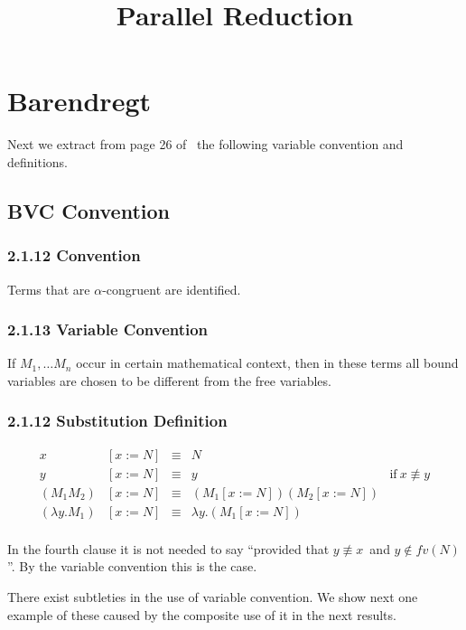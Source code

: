 \documentclass{article}
\title{Parallel Reduction}
\newcommand{\alp}{\ensuremath{\alpha}}
\newcommand{\lam}{\ensuremath{\lambda}}
\begin{document}
\maketitle

\section{Barendregt}

Next we extract from page 26 of~\cite{barendregt81} the following variable convention and definitions.

\subsection{BVC Convention}

\subsubsection*{2.1.12 Convention}

Terms that are \alp-congruent are identified.

\subsubsection*{2.1.13 Variable Convention}

If $M_1, \dots M_n$ occur in certain mathematical context, then in these terms all bound variables are chosen to be different from the free variables.


\subsubsection*{2.1.12 Substitution Definition} \label{sec:substitutionBarendregt}

\[
  \begin{array}{llcll}
    x &[x:=N] & \equiv & N &\\
    y &[x:=N] & \equiv & y & \text{if}\ x \not\equiv y\\
    (M_1 M_2) &[x:=N]& \equiv & (M_1 [x:=N]) (M_2 [x:=N]) &\\
    (\lam y . M_1) & [x:=N] & \equiv & \lam y . (M_1 [x:=N])&\\
  \end{array}
\]

\label{notefourth} In the fourth clause it is not needed to say ``provided that $y \not\equiv x$\ and $y \not\in fv(N)$''. By the variable convention this is the case.

There exist subtleties in the use of variable convention. We show next one example of these caused by the composite use of it in the next results.
\end{document}
